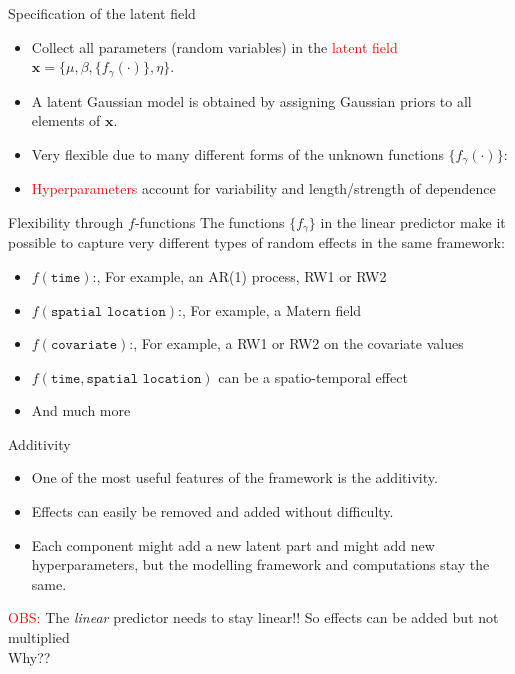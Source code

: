 \documentclass[
  ignorenonframetext,
]{beamer}
\providecommand{\tightlist}{%
  \setlength{\itemsep}{0pt}\setlength{\parskip}{0pt}}
\begin{document}
\begin{frame}{Specification of the latent field}
\protect\hypertarget{specification-of-the-latent-field}{}
\begin{itemize}[<+->]
\tightlist
\item
  Collect all parameters (random variables) in the
  \textcolor{red}{latent field}
  \(\mathbf{x} =\{\mu, {\beta}, \{f_\gamma(\cdot)\}, {\eta}\}\).
\item
  A latent Gaussian model is obtained by assigning Gaussian priors to
  all elements of \(\mathbf{x}\).
\item
  Very flexible due to many different forms of the unknown functions
  \(\{f_\gamma(\cdot)\}\):
\item
  \textcolor{red}{Hyperparameters} account for variability and
  length/strength of dependence
\end{itemize}
\end{frame}

\begin{frame}{Flexibility through \(f\)-functions}
\protect\hypertarget{flexibility-through-f-functions}{}
The functions \(\{f_\gamma\}\) in the linear predictor make it possible
to capture very different types of random effects in the same framework:

\begin{itemize}
\tightlist
\item
  \(f(\texttt{time})\):, For example, an AR(1) process, RW1 or RW2
\item
  \(f(\texttt{spatial location})\):, For example, a Matern field
\item
  \(f(\texttt{covariate})\):, For example, a RW1 or RW2 on the covariate
  values
\item
  \(f(\texttt{time}, \texttt{spatial location})\) can be a
  spatio-temporal effect
\item
  And much more
\end{itemize}
\end{frame}

\begin{frame}{Additivity}
\protect\hypertarget{additivity}{}
\begin{itemize}
\tightlist
\item
  One of the most useful features of the framework is the additivity.
\item
  Effects can easily be removed and added without difficulty.
\item
  Each component might add a new latent part and might add new
  hyperparameters, but the modelling framework and computations stay the
  same.
\end{itemize}

\pause

\textcolor{red}{OBS:} The \emph{linear} predictor needs to stay linear!!
So effects can be added but not multiplied\\

Why??
\end{frame}
\end{document}

